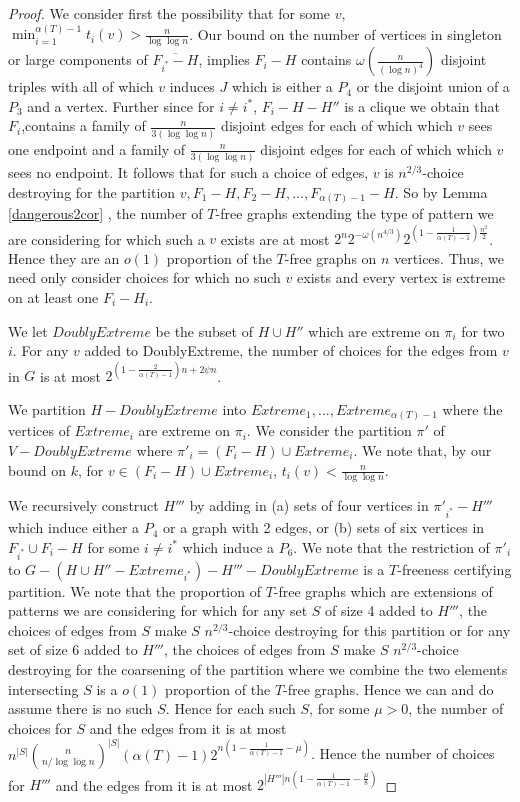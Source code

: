 \documentclass[10pt,a4paper]{amsart}
\begin{document}
\begin{proof}
We consider first the possibility that for some $v$, $\min_{i=1}^{\alpha(T)-1} t_i(v)> \frac{n}{\log \log n}$. 
Our bound on the number of  vertices in singleton or large components   of $\overline {F_{i^*}-H}$, implies   $F_i-H$ contains 
 $\omega(\frac{n}{(\log n)^4})$ disjoint triples with  all of which  $v$ induces   $J$ which is either a $P_4$ or the disjoint union of a $P_3$ and a vertex. 
Further since for $i \neq i^*$, $F_i-H-H''$ is a clique we obtain that  $F_i$,contains 
 a family of  $\frac{n}{3 (\log \log n)}$ disjoint edges for  each of which which $v$ sees one endpoint and 
a family of  $\frac{n}{3 (\log \log n)}$ disjoint  edges for  each of which which $v$ sees no  endpoint.
 It follows that  for such a choice of edges, $v$ is
$n^{2/3}$-choice destroying  for the partition $v,F_1-H,F_2-H,...,F_{\alpha(T)-1}-H$. 
So by Lemma \ref{dangerous2cor} , the  number  of $T$-free graphs  extending the type of pattern we are considering  for which such a $v$ exists are  at most 
$2^n2^{-\omega(n^{4/3})}2^{(1-\frac{1}{\alpha(T)-1})\frac{n^2}{2}}$. Hence they are     an $o(1)$ proportion of the $T$-free graphs on $n$ vertices. Thus, we need only consider choices for which no such $v$ exists and every vertex is extreme on at least one $F_i-H_i$. 

We  let $DoublyExtreme$ be the subset of $H \cup H''$ which are extreme on $\pi_i$ for two $i$. 
For any $v$ added to DoublyExtreme, the number of choices for the edges from 
$v$ in $G$ is at most $2^{(1-\frac{2}{\alpha(T)-1})n+2\psi n}$. 

We partition $H -DoublyExtreme$ into $Extreme_1,...,Extreme_{\alpha(T)-1}$ where the vertices of $Extreme_i$ are extreme on $\pi_i$.
We consider the partition $ \pi'$  of $V-DoublyExtreme$ where $\pi'_i=(F_i-H) \cup Extreme_i$. 
We note that, by our bound on $k$, for $v \in  (F_i -H) \cup Extreme_i$, $t_i(v)<\frac{n}{\log \log n}$.

We recursively construct $H'''$ by adding in  (a)  sets of  four vertices  in  $\pi'_{i^*} -H'''$ which induce either 
a $P_4$ or a graph with 2 edges, or (b) sets of six vertices in $F_{i^*} \cup F_i-H$  for some $i \neq i^*$ which induce a $P_6$.
We note that the restriction of $\pi'_i$ to  $G-(H \cup H'' -Extreme_{i^*})-H'''-DoublyExtreme$ is a $T$-freeness certifying partition. 
We note that  the proportion of $T$-free graphs which are extensions of patterns we are considering for which  for any set $S$ of size 4 added to $H'''$, the choices of edges from $S$ make $S$ $n^{2/3}$-choice destroying for this partition  or for any set of size 6  added to $H'''$, the choices of edges from $S$ make $S$ $n^{2/3}$-choice destroying for the coarsening of the partition where we combine the two elements intersecting $S$  is  a $o(1)$ proportion of the $T$-free graphs. Hence we can and do assume there is no such $S$. 
Hence for each such $S$,  for some $\mu>0$, the number of choices for $S$ and  the edges from it is at most $n^{|S|}{n \choose n/ \log \log n}^{|S|}(\alpha(T)-1)2^{n(1-\frac{1}{\alpha(T)-1}-\mu)}$.
Hence the number of choices for $H'''$ and the edges from it is at most $2^{|H'''|n(1-\frac{1}{\alpha(T)-1}-\frac{\mu}{8})}$



\end{proof}
\end{document}
